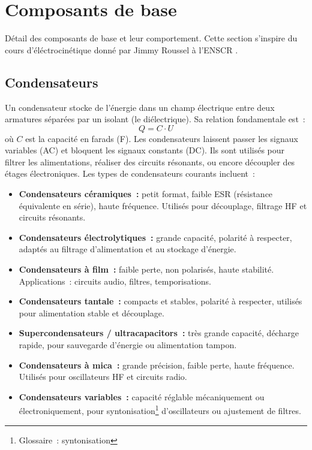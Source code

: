 \chapter{Composants de base} \label{chap:basic_components}
D\'etail des composants de base et leur comportement. Cette section s'inspire du cours d'\'el\'ectrocin\'etique donn\'e par Jimmy Roussel \`a l'ENSCR \autocite{femto-phy}.

\section{Condensateurs} \label{sec:capacitors}
Un condensateur stocke de l'\'energie dans un champ \'electrique entre deux armatures s\'epar\'ees par un isolant (le di\'electrique). Sa relation fondamentale est~:
\[
Q = C \cdot U
\]
où \(C\) est la capacit\'e en farads (\unit{\farad}).
Les condensateurs laissent passer les signaux variables (AC) et bloquent les signaux constants (DC). Ils sont utilis\'es pour filtrer les alimentations, r\'ealiser des circuits r\'esonants, ou encore d\'ecoupler des \'etages \'electroniques. Les types de condensateurs courants incluent~:
\begin{itemize}
  \item \textbf{Condensateurs c\'eramiques~:} petit format, faible ESR (r\'esistance \'equivalente en s\'erie), haute fr\'equence.
        Utilis\'es pour d\'ecouplage, filtrage HF et circuits r\'esonants.
  \item \textbf{Condensateurs \'electrolytiques~:} grande capacit\'e, polarit\'e à respecter,
        adapt\'es au filtrage d'alimentation et au stockage d'\'energie.
  \item \textbf{Condensateurs à film~:} faible perte, non polaris\'es, haute stabilit\'e.
        Applications~: circuits audio, filtres, temporisations.
  \item \textbf{Condensateurs tantale~:} compacts et stables, polarit\'e à respecter,
        utilis\'es pour alimentation stable et d\'ecouplage.
  \item \textbf{Supercondensateurs / ultracapacitors~:} tr\`es grande capacit\'e, d\'echarge rapide,
        pour sauvegarde d'\'energie ou alimentation tampon.
  \item \textbf{Condensateurs à mica~:} grande pr\'ecision, faible perte, haute fr\'equence.
        Utilis\'es pour oscillateurs HF et circuits radio.
  \item \textbf{Condensateurs variables~:} capacit\'e r\'eglable m\'ecaniquement ou \'electroniquement,
        pour syntonisation\footnote{Glossaire~: \gls{syntonisation}}  d'oscillateurs ou ajustement de filtres.
\end{itemize}
